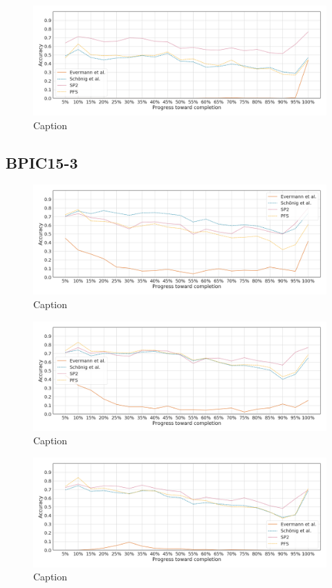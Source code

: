 \begin{figure}[!htb]
    \centering
    \includegraphics[width=\textwidth]{gfx/bpic2015_2/windowed_stability.png}
    \caption{Caption}
    \label{fig:my_label}
\end{figure}

\FloatBarrier
\subsection{BPIC15-3}
\begin{figure}[!htb]
    \centering
    \includegraphics[width=\textwidth]{gfx/bpic2015_3/individual_stability.png}
    \caption{Caption}
    \label{fig:my_label}
\end{figure}
\begin{figure}[!htb]
    \centering
    \includegraphics[width=\textwidth]{gfx/bpic2015_3/grouped_stability.png}
    \caption{Caption}
    \label{fig:my_label}
\end{figure}
\begin{figure}[!htb]
    \centering
    \includegraphics[width=\textwidth]{gfx/bpic2015_3/padded_stability.png}
    \caption{Caption}
    \label{fig:my_label}
\end{figure}
